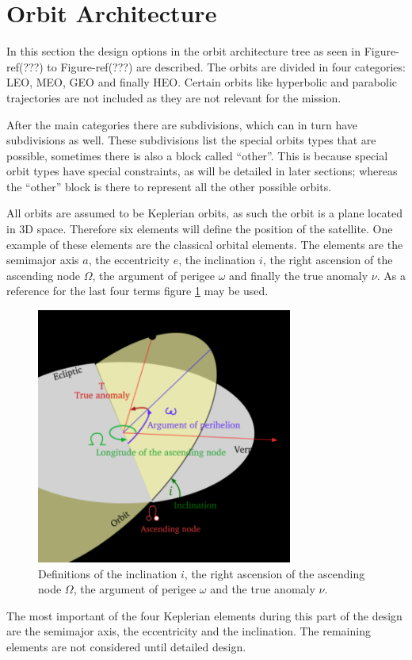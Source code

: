 \section{Orbit Architecture}
\label{blDOOrb}
In this section the design options in the orbit architecture tree as seen in Figure-ref(???) to Figure-ref(???) are described. The orbits are divided in four categories: \ac{LEO}, \ac{MEO}, \ac{GEO} and finally \ac{HEO}. Certain orbits like hyperbolic and parabolic trajectories are not included as they are not relevant for the mission.

After the main categories there are subdivisions, which can in turn have subdivisions as well. These subdivisions list the special orbits types that are possible, sometimes there is also a block called ``other''. This is because special orbit types have special constraints, as will be detailed in later sections; whereas the ``other'' block is there to represent all the other possible orbits.

All orbits are assumed to be Keplerian orbits, as such the orbit is a plane located in 3D space. Therefore six elements will define the position of the satellite. One example of these elements are the classical orbital elements. The elements are the semimajor axis $a$, the eccentricity $e$, the inclination $i$, the right ascension of the ascending node $\Omega$, the argument of perigee $\omega$ and finally the true anomaly $\nu$. As a reference for the last four terms figure \ref{OrbElements} may be used.
\begin{figure} [H]
	\begin{center}
         \includegraphics[width=0.75\textwidth,angle=0]{chapters/img/OrbElements.png}
	\caption{Definitions of the inclination $i$, the right ascension of the ascending node $\Omega$, the argument of perigee $\omega$ and the true anomaly $\nu$.}
	\label{OrbElements}
	\end{center}
	\end{figure}
The most important of the four Keplerian elements during this part of the design are the semimajor axis, the eccentricity and the inclination. The remaining elements are not considered until detailed design.

